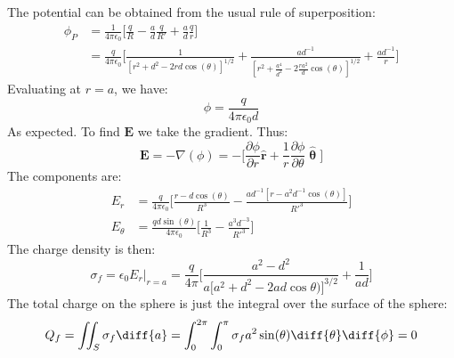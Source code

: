 \documentclass[crop=false,class=book,oneside]{standalone}
\begin{document}
            \begin{solution}
                The potential can be obtained from the usual rule
                of superposition:
                \begin{align}
                    \phi_{P}&=\frac{1}{4\pi\epsilon_{0}}\Big[
                    \frac{q}{R}-\frac{a}{d}\frac{q}{R'}+
                    \frac{a}{d}\frac{q}{r}\Big]\\
                    &=\frac{q}{4\pi\epsilon_{0}}\Big[
                        \frac{1}{[r^{2}+d^{2}-2rd\cos(\theta)]^{1/2}}
                        +\frac{ad^{\minus{1}}}
                            {[r^{2}+\frac{a^{4}}{d^{2}}
                             -2\frac{ra^{2}}{d}\cos(\theta)]^{1/2}}
                        +\frac{ad^{\minus{1}}}{r}\Big]
                \end{align}
                Evaluating at $r=a$, we have:
                \begin{equation}
                    \phi=\frac{q}{4\pi\epsilon_{0}d}
                \end{equation}
                As expected. To find $\mathbf{E}$ we take the
                gradient. Thus:
                \begin{equation}
                    \mathbf{E}=\minus\nabla(\phi)
                    =\minus\Big[
                        \frac{\partial\phi}{\partial{r}}
                        \hat{\mathbf{r}}+\frac{1}{r}
                        \frac{\partial\phi}{\partial\theta}
                        \hat{\mathbf{\uptheta}}\Big]
                \end{equation}
                The components are:
                \begin{align}
                    E_{r}&=\frac{q}{4\pi\epsilon_{0}}\Big[
                        \frac{r-d\cos(\theta)}{R^{3}}-
                        \frac{ad^{\minus{1}}
                              [r-a^{2}d^{\minus{1}}\cos(\theta)]}
                             {R'^{3}}\Big]\\
                    E_{\theta}&=
                        \frac{qd\sin(\theta)}{4\pi\epsilon_{0}}
                        \Big[\frac{1}{R^{3}}-
                            \frac{a^{3}d^{\minus{3}}}{R'^{3}}\Big]
                \end{align}
                The charge density is then:
                \begin{equation}
                    \sigma_{f}=\epsilon_{0}E_{r}\Big|_{r=a}
                    =\frac{q}{4\pi}\Big[
                        \frac{a^{2}-d^{2}}
                            {a[a^{2}+d^{2}-2ad\cos{\theta)]^{3/2}}}
                            +\frac{1}{ad}\Big]
                \end{equation}
                The total charge on the sphere is just the integral
                over the surface of the sphere:
                \begin{equation}
                    Q_{f}=\iint_{S}\sigma_{f}\diff{a}
                    =\int_{0}^{2\pi}\int_{0}^{\pi}
                        \sigma_{f}a^{2}\sin(\theta)
                        \diff{\theta}\diff{\phi}=0
                \end{equation}
            \end{solution}
\end{document}
